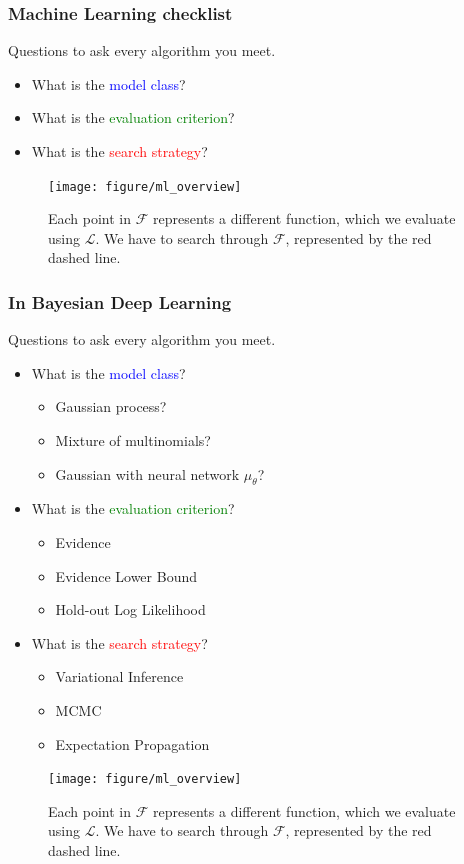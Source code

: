 \documentclass[10pt,mathserif]{beamer}
\begin{document}
\begin{frame}
  \frametitle{Machine Learning checklist}
  Questions to ask every algorithm you meet.
 \begin{itemize}
 \item What is the \textcolor{blue}{model class}?
 \item What is the \textcolor{green}{evaluation criterion}?
 \item What is the \textcolor{red}{search strategy}?
 \end{itemize}
\begin{figure}[ht]
  \centering
  \texttt{[image: figure/ml\_overview]}
  \caption{Each point in $\mathcal{F}$ represents a different function, which we
    evaluate using $\mathcal{L}$. We have to search through $\mathcal{F}$,
    represented by the red dashed line. \label{fig:ml_overview} }
\end{figure}
\end{frame}

\begin{frame}
  \frametitle{In Bayesian Deep Learning}
  Questions to ask every algorithm you meet.
 \begin{itemize}
 \item What is the \textcolor{blue}{model class}?
   \begin{itemize}
   \item Gaussian process?
   \item Mixture of multinomials?
   \item Gaussian with neural network $\mu_{\theta}$?
   \end{itemize}
 \item What is the \textcolor{green}{evaluation criterion}?
   \begin{itemize}
   \item Evidence
   \item Evidence Lower Bound
   \item Hold-out Log Likelihood
   \end{itemize}
 \item What is the \textcolor{red}{search strategy}?
   \begin{itemize}
   \item Variational Inference
   \item MCMC
   \item Expectation Propagation
   \end{itemize}
 \end{itemize}
\begin{figure}[ht]
  \centering
  \texttt{[image: figure/ml\_overview]}
  \caption{Each point in $\mathcal{F}$ represents a different function, which we
    evaluate using $\mathcal{L}$. We have to search through $\mathcal{F}$,
    represented by the red dashed line. \label{fig:ml_overview} }
\end{figure}
\end{frame}
\end{document}
